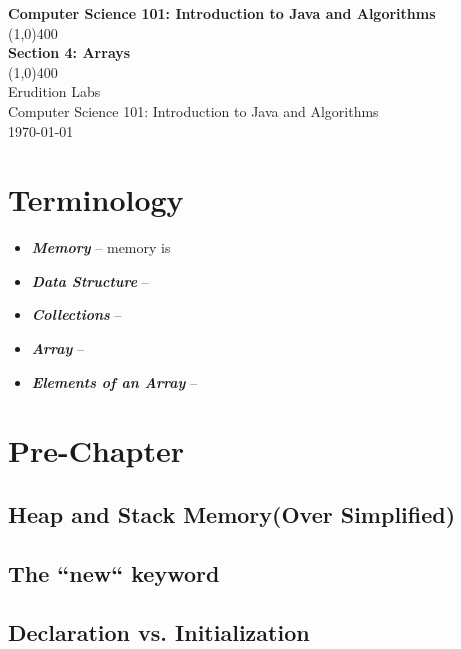 \documentclass[11]{article}
\begin{document}
\begin{titlepage}
\begin{center}
\vspace{1cm}
\Large{\textbf{Computer Science 101: Introduction to Java and Algorithms}}\\
\vfill
\line(1,0){400}\\
\huge{\textbf{Section 4: Arrays}}\\
\line(1,0){400}\\
\vfill
Erudition Labs\\
Computer Science 101: Introduction to Java and Algorithms\\
\today\\
\end{center}
\end{titlepage}

\tableofcontents
\thispagestyle{empty}
\clearpage
\setcounter{page}{1}

\section{Terminology}
\begin{itemize}
  \item \textbf{\textit{Memory}} --
  memory is
  
  \item \textbf{\textit{Data Structure}} --
  
  \item \textbf{\textit{Collections}} --
  
  \item \textbf{\textit{Array}} --
  
  \item \textbf{\textit{Elements of an Array}} --
\end{itemize}
\section{Pre-Chapter}
\subsection{Heap and Stack Memory(Over Simplified)}
\subsection{The ``new`` keyword}
\subsection{Declaration vs. Initialization}
\end{document}
